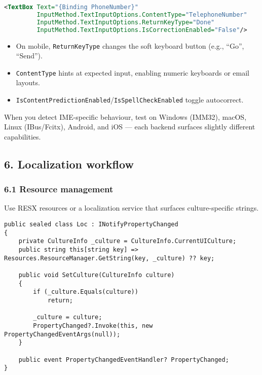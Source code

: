 \begin{lstlisting}[language=XML]
<TextBox Text="{Binding PhoneNumber}"
         InputMethod.TextInputOptions.ContentType="TelephoneNumber"
         InputMethod.TextInputOptions.ReturnKeyType="Done"
         InputMethod.TextInputOptions.IsCorrectionEnabled="False"/>
\end{lstlisting}

\begin{itemize}
\tightlist
\item
  On mobile, \passthrough{\lstinline!ReturnKeyType!} changes the soft
  keyboard button (e.g., ``Go'', ``Send'').
\item
  \passthrough{\lstinline!ContentType!} hints at expected input,
  enabling numeric keyboards or email layouts.
\item
  \passthrough{\lstinline!IsContentPredictionEnabled!}/\passthrough{\lstinline!IsSpellCheckEnabled!}
  toggle autocorrect.
\end{itemize}

When you detect IME-specific behaviour, test on Windows (IMM32), macOS,
Linux (IBus/Fcitx), Android, and iOS --- each backend surfaces slightly
different capabilities.

\subsection{6. Localization workflow}\label{localization-workflow}

\subsubsection{6.1 Resource management}\label{resource-management}

Use RESX resources or a localization service that surfaces
culture-specific strings.

\begin{lstlisting}
public sealed class Loc : INotifyPropertyChanged
{
    private CultureInfo _culture = CultureInfo.CurrentUICulture;
    public string this[string key] => Resources.ResourceManager.GetString(key, _culture) ?? key;

    public void SetCulture(CultureInfo culture)
    {
        if (_culture.Equals(culture))
            return;

        _culture = culture;
        PropertyChanged?.Invoke(this, new PropertyChangedEventArgs(null));
    }

    public event PropertyChangedEventHandler? PropertyChanged;
}
\end{lstlisting}

